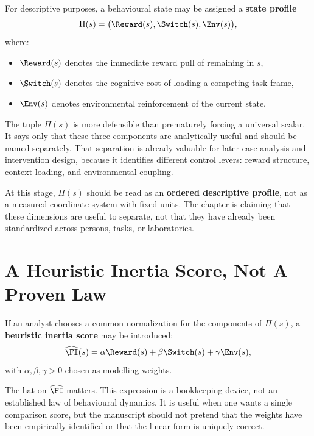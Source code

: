 \begin{definition}
For descriptive purposes, a behavioural state may be assigned a
\textbf{state profile}
\[
  \Pi(s) = \bigl(\Reward(s), \Switch(s), \Env(s)\bigr),
\]
where:
\begin{itemize}[nosep]
  \item $\Reward(s)$ denotes the immediate reward pull of remaining in $s$,
  \item $\Switch(s)$ denotes the cognitive cost of loading a competing task
        frame,
  \item $\Env(s)$ denotes environmental reinforcement of the current state.
\end{itemize}
\end{definition}

\begin{discussion}
The tuple $\Pi(s)$ is more defensible than prematurely forcing a universal
scalar. It says only that these three components are analytically useful and
should be named separately. That separation is already valuable for later case
analysis and intervention design, because it identifies different control
levers: reward structure, context loading, and environmental coupling.
\end{discussion}

\begin{remark}
At this stage, $\Pi(s)$ should be read as an \textbf{ordered descriptive
profile}, not as a measured coordinate system with fixed units. The chapter is
claiming that these dimensions are useful to separate, not that they have
already been standardized across persons, tasks, or laboratories.
\end{remark}

\section{A Heuristic Inertia Score, Not A Proven Law}

\begin{definition}
If an analyst chooses a common normalization for the components of
$\Pi(s)$, a \textbf{heuristic inertia score} may be introduced:
\[
  \widehat{\FI}(s) = \alpha \Reward(s) + \beta \Switch(s) + \gamma \Env(s),
\]
with $\alpha,\beta,\gamma > 0$ chosen as modelling weights.
\end{definition}

\begin{remark}
The hat on $\widehat{\FI}$ matters. This expression is a bookkeeping device,
not an established law of behavioural dynamics. It is useful when one wants a
single comparison score, but the manuscript should not pretend that the weights
have been empirically identified or that the linear form is uniquely correct.
\end{remark}

